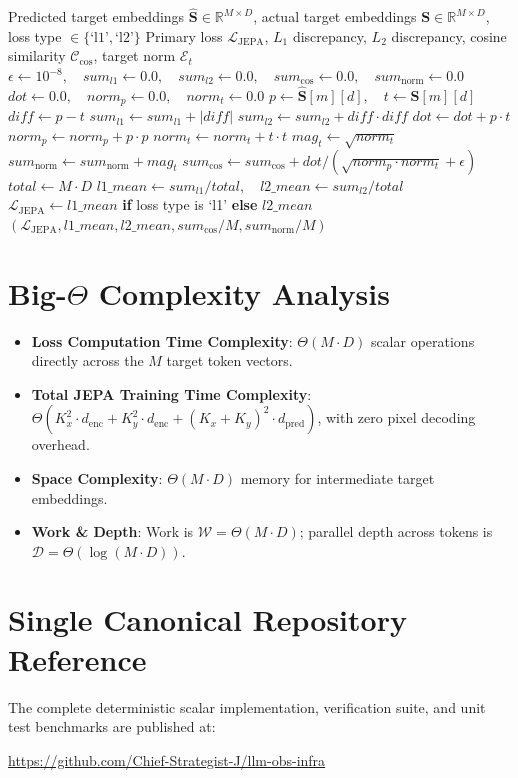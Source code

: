 \documentclass[11pt,a4paper]{article}
\theoremstyle{definition}
\begin{document}
\begin{algorithm}[H]
\caption{Joint-Embedding Predictive Architecture Latent Loss Evaluation}
\begin{algorithmic}[1]
\Require Predicted target embeddings $\hat{\mathbf{S}} \in \mathbb{R}^{M \times D}$, actual target embeddings $\mathbf{S} \in \mathbb{R}^{M \times D}$, loss type $\in \{\text{`l1'}, \text{`l2'}\}$
\Ensure Primary loss $\mathcal{L}_{\text{JEPA}}$, $L_1$ discrepancy, $L_2$ discrepancy, cosine similarity $\mathcal{C}_{\text{cos}}$, target norm $\mathcal{E}_t$
\State $\epsilon \gets 10^{-8}, \quad sum_{l1} \gets 0.0, \quad sum_{l2} \gets 0.0, \quad sum_{\text{cos}} \gets 0.0, \quad sum_{\text{norm}} \gets 0.0$
    \State $dot \gets 0.0, \quad norm_p \gets 0.0, \quad norm_t \gets 0.0$
        \State $p \gets \hat{\mathbf{S}}[m][d], \quad t \gets \mathbf{S}[m][d]$
        \State $diff \gets p - t$
        \State $sum_{l1} \gets sum_{l1} + |diff|$
        \State $sum_{l2} \gets sum_{l2} + diff \cdot diff$
        \State $dot \gets dot + p \cdot t$
        \State $norm_p \gets norm_p + p \cdot p$
        \State $norm_t \gets norm_t + t \cdot t$
    \EndFor
    \State $mag_t \gets \sqrt{norm_t}$
    \State $sum_{\text{norm}} \gets sum_{\text{norm}} + mag_t$
    \State $sum_{\text{cos}} \gets sum_{\text{cos}} + dot / (\sqrt{norm_p \cdot norm_t} + \epsilon)$
\EndFor
\State $total \gets M \cdot D$
\State $l1\_mean \gets sum_{l1} / total, \quad l2\_mean \gets sum_{l2} / total$
\State $\mathcal{L}_{\text{JEPA}} \gets l1\_mean$ \textbf{if} loss type is `l1' \textbf{else} $l2\_mean$
\State \Return $(\mathcal{L}_{\text{JEPA}}, l1\_mean, l2\_mean, sum_{\text{cos}} / M, sum_{\text{norm}} / M)$
\end{algorithmic}
\end{algorithm}

\section{Big-$\Theta$ Complexity Analysis}

\begin{itemize}
    \item \textbf{Loss Computation Time Complexity}: $\Theta(M \cdot D)$ scalar operations directly across the $M$ target token vectors.
    \item \textbf{Total JEPA Training Time Complexity}: $\Theta(K_x^2 \cdot d_{\text{enc}} + K_y^2 \cdot d_{\text{enc}} + (K_x + K_y)^2 \cdot d_{\text{pred}})$, with zero pixel decoding overhead.
    \item \textbf{Space Complexity}: $\Theta(M \cdot D)$ memory for intermediate target embeddings.
    \item \textbf{Work \& Depth}: Work is $\mathcal{W} = \Theta(M \cdot D)$; parallel depth across tokens is $\mathcal{D} = \Theta(\log(M \cdot D))$.
\end{itemize}

\section{Single Canonical Repository Reference}

The complete deterministic scalar implementation, verification suite, and unit test benchmarks are published at:
\begin{center}
\url{https://github.com/Chief-Strategist-J/llm-obs-infra}
\end{center}
\end{document}
